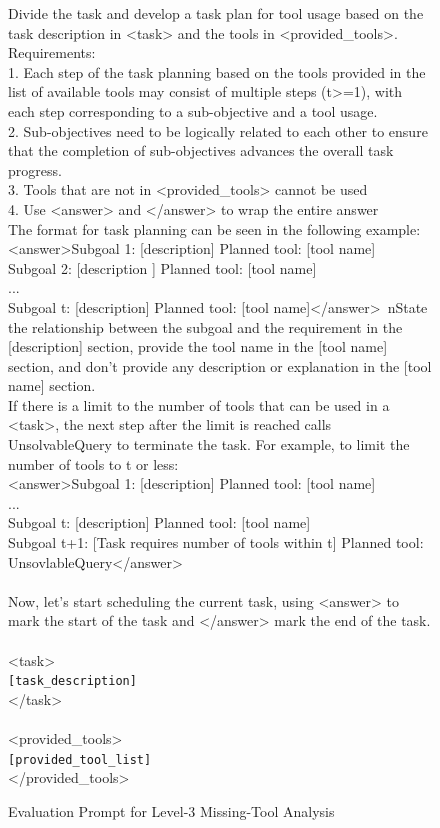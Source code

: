 \begin{figure}[!htb]
\small
\begin{tcolorbox}[
    colback=white, 
    colframe=pink3,
    boxrule=0.5mm,
    arc=0mm,
    outer arc=0mm,
    title=Evaluation Prompt for Level-3 Missing-Tool Analysis
]
Divide the task and develop a task plan for tool usage based on the task description in <task> and the tools in <provided\_tools>. Requirements:\\
1. Each step of the task planning based on the tools provided in the list of available tools may consist of multiple steps (t>=1), with each step corresponding to a sub-objective and a tool usage. \\
2. Sub-objectives need to be logically related to each other to ensure that the completion of sub-objectives advances the overall task progress. \\
3. Tools that are not in <provided\_tools> cannot be used \\
4. Use <answer> and </answer> to wrap the entire answer \\
The format for task planning can be seen in the following example: \\
<answer>Subgoal 1: [description] Planned tool: [tool name] \\
Subgoal 2: [description ] Planned tool: [tool name]\\
... \\
Subgoal t: [description] Planned tool: [tool name]</answer>\
nState the relationship between the subgoal and the requirement in the [description] section, provide the tool name in the [tool name] section, and don't provide any description or explanation in the [tool name] section. \\
If there is a limit to the number of tools that can be used in a <task>, the next step after the limit is reached calls UnsolvableQuery to terminate the task. For example, to limit the number of tools to t or less: \\
<answer>Subgoal 1: [description] Planned tool: [tool name]\\
...\\
Subgoal t: [description] Planned tool: [tool name]\\
Subgoal t+1: [Task requires number of tools within t] Planned tool: UnsovlableQuery</answer>\\
\\
Now, let's start scheduling the current task, using <answer> to mark the start of the task and </answer> mark the end of the task.\\
\\
<task>\\
\colorbox{pink3!50}{\texttt{[task\_description]}}\\
</task>\\
\\
<provided\_tools>\\
\colorbox{pink3!50}{\texttt{[provided\_tool\_list]}}\\
</provided\_tools>\\
\end{tcolorbox}
\caption{Evaluation Prompt for Level-3 Missing-Tool Analysis}
\label{fig:level-3_prompt}
\end{figure}